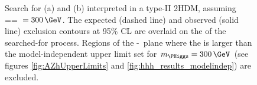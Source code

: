\begin{figure}[h!]
\begin{center}
\caption[Search for \Htohhtobbtautau and search for \AtoZhtolltautau
interpreted in a type-II 2HDM, assuming \mA=\mH=\mHplus~$=300\,\GeV$.]{Search for (a) \Htohhtobbtautau and (b) \AtoZhtolltautau interpreted in a type-II 
\ac{2HDM}, assuming \mA=\mH=\mHplus~$= 300\,\GeV$. The expected (dashed line)
and observed (solid line) exclusion contours at 95\% \ac{CL} are overlaid
on the \xsbr of the searched-for process.
Regions of the \cosba-\tanb~plane where the 
\xsbr is larger than the model-independent upper limit set for $m_{\PHiggs} = 300\,\GeV$ 
(see figures \ref{fig:AZhUpperLimits} and \ref{fig:hhh_results_modelindep}) are excluded.}
\label{fig:HhhandAZh2HDMOverlaid}
\end{center}
\end{figure}


